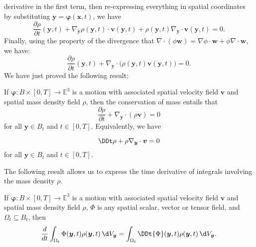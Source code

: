 \documentclass[
  letterpaper,
  DIV=11,
  numbers=noendperiod]{scrreprt}
\theoremstyle{plain}
\theoremstyle{remark}
\begin{document}
derivative in the first term, then re-expressing everything in spatial
coordinates by substituting
\({\boldsymbol{y}}={\boldsymbol{\varphi}}({\boldsymbol{x}},t)\), we have
\[\frac{\partial\rho}{\partial t}({\boldsymbol{y}},t) + \nabla_{\boldsymbol{y}}\rho({\boldsymbol{y}},t)\cdot{\boldsymbol{v}}({\boldsymbol{y}},t)+\rho({\boldsymbol{y}},t)\nabla_{\boldsymbol{y}}\cdot{\boldsymbol{v}}({\boldsymbol{y}},t)= 0.\]
Finally, using the property of the divergence that
\(\nabla\cdot(\phi{\boldsymbol{w}}) = \nabla\phi\cdot{\boldsymbol{w}}+\phi\nabla\cdot{\boldsymbol{w}}\),
we have:
\[\frac{\partial\rho}{\partial t}({\boldsymbol{y}},t) + \nabla_{\boldsymbol{y}}\cdot\big(\rho({\boldsymbol{y}},t){\boldsymbol{v}}({\boldsymbol{y}},t)\big)= 0.\]
We have just proved the following result:

If \({\boldsymbol{\varphi}}:B\times[0,T]\to{\mathbb{E}}^3\) is a motion
with associated spatial velocity field \({\boldsymbol{v}}\) and spatial
mass density field \(\rho\), then the conservation of mass entails that
\[\frac{\partial \rho}{\partial t} +\nabla_{\boldsymbol{y}}\cdot(\rho{\boldsymbol{v}}) = 0\]
for all \({\boldsymbol{y}}\in B_t\) and \(t\in[0,T]\). Equivalently, we
have

\[\DDt\rho +\rho\nabla_{\boldsymbol{y}}\cdot{\boldsymbol{v}}= 0\] for
all \({\boldsymbol{y}}\in B_t\) and \(t\in[0,T]\).

The following result allows us to express the time derivative of
integrals involving the mass density \(\rho\).

\label{prop:TimeDerivativeMassIntegrals}{} If
\({\boldsymbol{\varphi}}:B\times[0,T]\to{\mathbb{E}}^3\) is a motion
with associated spatial velocity field \({\boldsymbol{v}}\) and spatial
mass density field \(\rho\), \(\Phi\) is any spatial scalar, vector or
tensor field, and \(\Omega_t\subseteq B_t\), then
\[\frac{d}{dt}\int_{\Omega_t}\Phi({\boldsymbol{y}},t)\rho({\boldsymbol{y}},t){\,\d V_{{\boldsymbol{y}}}}=\int_{\Omega_t}\DDt{\Phi}({\boldsymbol{y}},t)\rho({\boldsymbol{y}},t){\,\d V_{{\boldsymbol{y}}}}.\]
\end{document}

